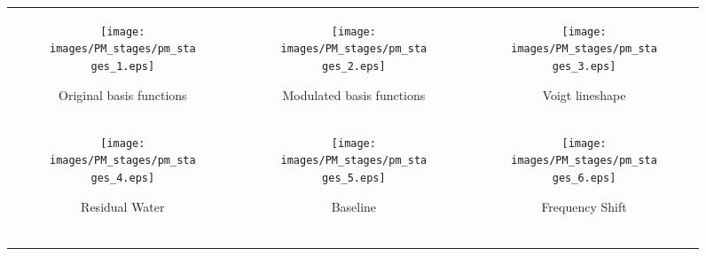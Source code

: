 \documentclass[AMA,LATO1COL]{WileyNJD-v2}
\begin{document}
\begin{figure}
    \centering
    \begin{tabular}[l]{ccc}
    \begin{subfigure}[c]{0.315\textwidth}
        \texttt{[image: images/PM\_stages/pm\_stages\_1.eps]}
        \caption{Original basis functions}
        \label{fig:PM_stages:basis functions}\vspace{0.2\baselineskip}
    \end{subfigure}&
    \begin{subfigure}[c]{0.315\textwidth}
        \texttt{[image: images/PM\_stages/pm\_stages\_2.eps]}
        \caption{Modulated basis functions}
        \label{fig:PM_stages:modulated}\vspace{0.2\baselineskip}
    \end{subfigure}&
    \begin{subfigure}[c]{0.315\textwidth}
        \texttt{[image: images/PM\_stages/pm\_stages\_3.eps]}
        \caption{Voigt lineshape}
        \label{fig:PM_stages:B0 inhomogeneities}\vspace{0.2\baselineskip}
    \end{subfigure}\\[25pt]
    \begin{subfigure}[c]{0.315\textwidth}
        \texttt{[image: images/PM\_stages/pm\_stages\_4.eps]}
        \caption{Residual Water}
        \label{fig:PM_stages:lineshape}\vspace{0.2\baselineskip}
    \end{subfigure}&
    \begin{subfigure}[c]{0.315\textwidth}
        \texttt{[image: images/PM\_stages/pm\_stages\_5.eps]}
        \caption{Baseline}
        \label{fig:PM_stages:phi1}\vspace{0.2\baselineskip}
    \end{subfigure}&
    \begin{subfigure}[c]{0.315\textwidth}
        \texttt{[image: images/PM\_stages/pm\_stages\_6.eps]}
        \caption{Frequency Shift}
        \label{fig:PM_stages:phi0}\vspace{0.2\baselineskip}\vspace{0.2\baselineskip}
    \end{subfigure}\\[25pt]
    \begin{subfigure}[c]{0.315\textwidth}

\end{subfigure}
\end{tabular}
\end{figure}
\end{document}
